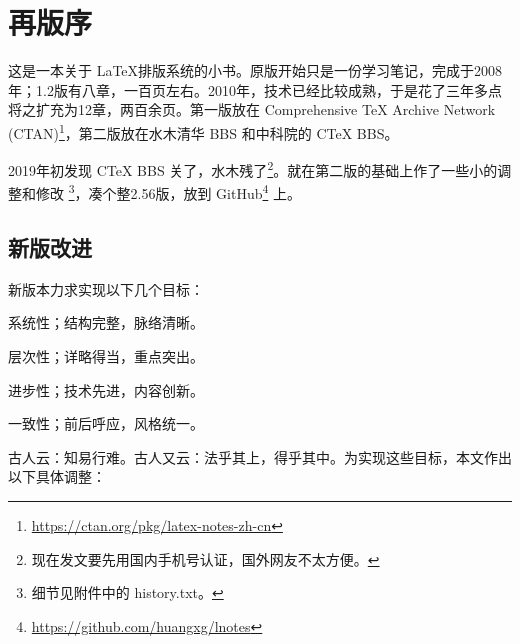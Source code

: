 \chapter{再版序}

这是一本关于 \LaTeX 排版系统的小书。原版开始只是一份学习笔记，完成于2008年；1.2版有八章，一百页左右。2010年，\XeTeX 技术已经比较成熟，于是花了三年多点将之扩充为12章，两百余页。第一版放在 Comprehensive \TeX{} Archive Network (CTAN)\footnote{\url{https://ctan.org/pkg/latex-notes-zh-cn}}，第二版放在水木清华 BBS 和中科院的 CTeX BBS。

2019年初发现 CTeX BBS 关了，水木残了\footnote{现在发文要先用国内手机号认证，国外网友不太方便。}。就在第二版的基础上作了一些小的调整和修改 \footnote{细节见附件中的 history.txt。}，凑个整2.56版，放到 GitHub\footnote{\url{https://github.com/huangxg/lnotes}} 上。

\section*{新版改进}
新版本力求实现以下几个目标：

\begin{compactenum}
  \item 系统性；结构完整，脉络清晰。
  \item 层次性；详略得当，重点突出。
  \item 进步性；技术先进，内容创新。
  \item 一致性；前后呼应，风格统一。
\end{compactenum}

古人云：知易行难。古人又云：法乎其上，得乎其中。为实现这些目标，本文作出以下具体调整：

